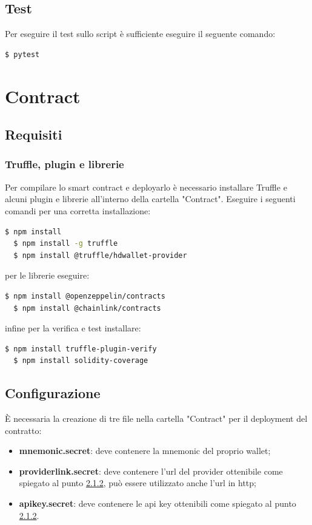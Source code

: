 \documentclass[a4paper, 12pt]{article}
\begin{document}
\subsection{Test}
Per eseguire il test sullo script è sufficiente eseguire il seguente comando:
\begin{lstlisting}[language=bash]
$ pytest
\end{lstlisting}
\section{Contract}
\subsection{Requisiti}
\subsubsection{Truffle, plugin e librerie}
Per compilare lo smart contract e deployarlo è necessario installare Truffle e alcuni plugin e librerie all'interno della cartella "Contract". Eseguire i seguenti comandi per una corretta installazione:
\begin{lstlisting}[language=bash]
  $ npm install
  $ npm install -g truffle
  $ npm install @truffle/hdwallet-provider
\end{lstlisting}
per le librerie eseguire:
\begin{lstlisting}[language=bash]
  $ npm install @openzeppelin/contracts
  $ npm install @chainlink/contracts
\end{lstlisting}
infine per la verifica e test installare:
\begin{lstlisting}[language=bash]
  $ npm install truffle-plugin-verify
  $ npm install solidity-coverage
\end{lstlisting}
\subsection{Configurazione}
È necessaria la creazione di tre file nella cartella "Contract" per il deployment del contratto:
\begin{itemize}
  \item \textbf{mnemonic.secret}: deve contenere la mnemonic del proprio wallet;
  \item \textbf{providerlink.secret}: deve contenere l'url del provider ottenibile come spiegato al punto \hyperref[sec:provider]{2.1.2}, può essere utilizzato anche l'url in http;
  \item \textbf{apikey.secret}: deve contenere le api key ottenibili come spiegato al punto \hyperref[sec:provider]{2.1.2}.
\end{itemize}
\end{document}

